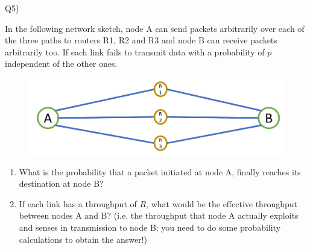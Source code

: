 \documentclass[10pt,letterpaper]{article}
\begin{document}
Q5)

In the following network sketch, node A can send packets arbitrarily over each of the three paths to routers R1, R2 and R3 and node B can receive packets arbitrarily too. If each link fails to transmit data with a probability of $p$ independent of the other ones.
\begin{figure}[ht]
\centering
\includegraphics[width=140mm]{p2p_multi}
\end{figure}
\begin{enumerate}[label=\alph*-]
\item
What is the probability that a packet initiated at node A, finally reaches its destination at node B?
\item
If each link has a throughput of $R$, what would be the effective throughput between nodes A and B? (i.e. the throughput that node A actually exploits and senses in transmission to node B; you need to do some probability calculations to obtain the answer!)
\end{enumerate}
%
%
%
%
%
%
%
%
%
\end{document}
